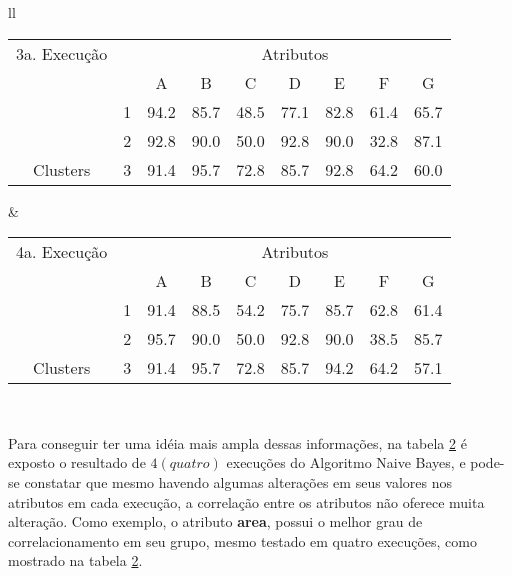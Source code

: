 \begin{table}[!h]
\begin{tabular}{ll}
   \small\addtolength{\tabcolsep}{-4pt}
   \begin{tabular}{|cl|c|c|c|c|c|c|c|}
        \hline \hline
          {\tiny 3a. Execução}     &   & \multicolumn{7}{c|}{Atributos}                                               \\ \cline{3-9} 
       \multicolumn{1}{|l}{}                            &   & A    & B & C & D & E & F & G \\ \hline
        \multicolumn{1}{|c|}{}                           & 1 & 94.2 & 85.7   & 48.5      & 77.1 & 82.8 & 61.4   & 65.7   \\ \cline{2-9} 
        \multicolumn{1}{|c|}{}                           & 2 & 92.8 & 90.0   & 50.0      & 92.8 & 90.0 & 32.8  & 87.1  \\ \cline{2-9} 
        \multicolumn{1}{|c|}{\multirow{-3}{*}{Clusters}} & 3 & 91.4 & 95.7   & 72.8      & 85.7 & 92.8 & 64.2  & 60.0  \\ \hline
   \end{tabular}
    
    &
    
       \small\addtolength{\tabcolsep}{-4pt}
   \begin{tabular}{|cl|c|c|c|c|c|c|c|}
        \hline \hline
            {\tiny 4a. Execução }   &   & \multicolumn{7}{c|}{Atributos}                                               \\ \cline{3-9} 
       \multicolumn{1}{|l}{}                            &   & A    & B & C & D & E & F & G \\ \hline
        \multicolumn{1}{|c|}{}                           & 1 & 91.4 & 88.5   & 54.2      & 75.7 & 85.7 & 62.8   & 61.4   \\ \cline{2-9} 
        \multicolumn{1}{|c|}{}                           & 2 & 95.7 & 90.0   & 50.0      & 92.8 & 90.0 & 38.5  & 85.7  \\ \cline{2-9} 
        \multicolumn{1}{|c|}{\multirow{-3}{*}{Clusters}} & 3 & 91.4 & 95.7   & 72.8      & 85.7 & 94.2 & 64.2  & 57.1  \\ \hline
   \end{tabular}
   \\
 
 \end{tabular}
 \label{tab:execucoes:seed:nb}
\end{table}

Para conseguir ter uma idéia mais ampla dessas informações, na tabela \ref{tab:execucoes:seed:nb} é exposto o resultado de ${4(quatro)}$ execuções do Algoritmo Naive Bayes, e pode-se constatar que mesmo havendo algumas alterações em seus valores nos atributos em cada execução, a correlação entre os atributos não oferece muita alteração. Como exemplo, o atributo \textbf{area}, possui o melhor grau de correlacionamento em seu grupo, mesmo testado em quatro execuções, como mostrado na tabela \ref{tab:execucoes:seed:nb}.

